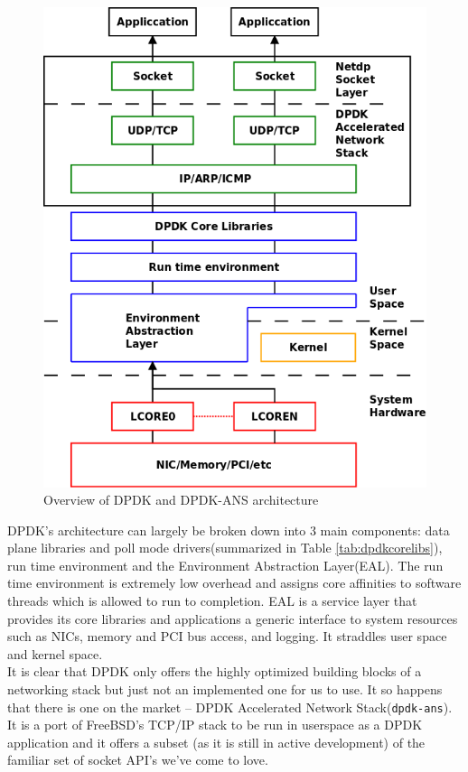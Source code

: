 \documentclass{sig-alternate-05-2015}
\begin{document}
\begin{figure}[]
\centering
\includegraphics[scale=0.3]{dpdk_archi.png}
\caption{Overview of DPDK and DPDK-ANS architecture}
\label{fig:dpdk-archi}
\end{figure} 

DPDK's architecture can largely be broken down into 3 main components: data plane libraries and poll mode drivers(summarized in Table \ref{tab:dpdkcorelibs}), run time environment and the Environment Abstraction Layer(EAL). The run time environment is extremely low overhead and assigns core affinities to software threads which is allowed to run to completion. EAL is a service layer that provides its core libraries and applications a generic interface to system resources such as NICs, memory and PCI bus access, and logging. It straddles user space and kernel space. \cite{dpdk:programmerguide} \\

It is clear that DPDK only offers the highly optimized building blocks of a networking stack but just not an implemented one for us to use. It so happens that there is one on the market -- DPDK Accelerated Network Stack(\texttt{dpdk-ans}). It is a port of FreeBSD's TCP/IP stack to be run in userspace as a DPDK application and it offers a subset (as it is still in active development) of the familiar set of socket API's we've come to love.
\end{document}
